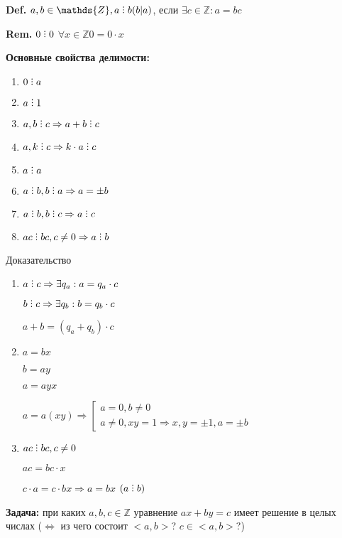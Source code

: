 \documentclass[14pt, letter paper]{article}
\def\divby{%
  \mathrel{\text{\vbox{\baselineskip.65ex\lineskiplimit0pt\hbox{.}\hbox{.}\hbox{.}}}}%
}
\begin{document}
\textbf{Def.} $a, b \in \mathds{Z}, a \divby b (b | a)$, если $\exists c \in \mathds{Z}: a = bc$

\textbf{Rem.} $0 \divby 0$ $\forall x \in \mathds{Z} 0 = 0 \cdot x$

\textbf{Основные свойства делимости:}
\begin{enumerate}
    \item $0 \divby a$
    \item $a \divby 1$
    \item $a, b \divby c \Rightarrow a + b \divby c$
    \item $a, k \divby c \Rightarrow k \cdot a \divby c$
    \item $a \divby a$
    \item $a \divby b, b \divby a \Rightarrow a = \pm b$
    \item $a \divby b, b \divby c \Rightarrow a \divby c$
    \item $ac \divby bc, c \neq 0 \Rightarrow a \divby b$
\end{enumerate}

\begin{center}
    Доказательство
\end{center}

\begin{enumerate}
    \item[3.] $a \divby c \Rightarrow \exists q_a: a = q_a \cdot c$

    $b \divby c \Rightarrow \exists q_b: b = q_b \cdot c$

    $a + b = (q_a + q_b) \cdot c$

    \item[6.] $a = bx$

    $b = ay$

    $a = ayx$

    $a = a(xy) \Rightarrow \left[ \begin{gathered} a = 0, b \neq 0 \\ a \neq 0, xy = 1 \Rightarrow x, y = \pm 1, a = \pm b \end{gathered} \right.$

    \item[8.] $ac \divby bc, c \neq 0$ 
    
    $ac = bc \cdot x$

    $c \cdot a = c \cdot bx \Rightarrow a = bx$ $(a \divby b)$
\end{enumerate}

\textbf{Задача:} при каких $a, b, c \in \mathds{Z}$ уравнение $ax + by = c$ имеет решение в целых числах ($\Leftrightarrow$ из чего состоит $<a, b>$? $c \in <a, b>$?)
\end{document}
